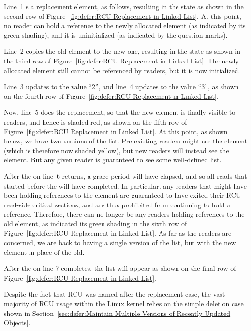 Line~1 s a replacement element, as follows,
resulting in the state as shown in the second row of
Figure~\ref{fig:defer:RCU Replacement in Linked List}.
At this point, no reader can hold a reference to the newly allocated
element (as indicated by its green shading), and it is uninitialized
(as indicated by the question marks).

Line~2 copies the old element to the new one, resulting in the
state as shown in the third row of
Figure~\ref{fig:defer:RCU Replacement in Linked List}.
The newly allocated element still cannot be referenced by readers, but
it is now initialized.

Line~3 updates  to the value ``2'', and
line~4 updates  to the value ``3'', as shown on the fourth row of
Figure~\ref{fig:defer:RCU Replacement in Linked List}.

Now, line~5 does the replacement, so that the new element is
finally visible to readers, and hence is shaded red, as shown on
the fifth row of
Figure~\ref{fig:defer:RCU Replacement in Linked List}.
At this point, as shown below, we have two versions of the list.
Pre-existing readers might see the  element (which is
therefore now shaded yellow), but
new readers will instead see the  element.
But any given reader is guaranteed to see some well-defined list.

After the  on line~6 returns,
a grace period will have elapsed, and so all reads that started before the
 will have completed.
In particular, any readers that might have been holding references
to the  element are guaranteed to have exited
their RCU read-side critical sections, and are thus prohibited from
continuing to hold a reference.
Therefore, there can no longer be any readers holding references
to the old element, as indicated its green shading in the sixth row of
Figure~\ref{fig:defer:RCU Replacement in Linked List}.
As far as the readers are concerned, we are back to having a single version
of the list, but with the new element in place of the old.

After the  on line 7 completes, the list will
appear as shown on the final row of
Figure~\ref{fig:defer:RCU Replacement in Linked List}.

Despite the fact that RCU was named after the replacement case,
the vast majority of RCU usage within the Linux kernel relies on
the simple deletion case shown in
Section~\ref{sec:defer:Maintain Multiple Versions of Recently Updated Objects}.

